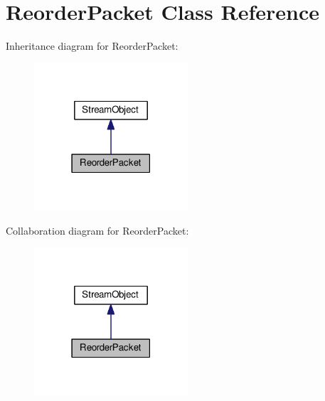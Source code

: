 \hypertarget{class_reorder_packet}{}\section{Reorder\+Packet Class Reference}
\label{class_reorder_packet}


Inheritance diagram for Reorder\+Packet\+:\nopagebreak
\begin{figure}[H]
\begin{center}
\leavevmode
\includegraphics[width=162pt]{class_reorder_packet__inherit__graph}
\end{center}
\end{figure}


Collaboration diagram for Reorder\+Packet\+:\nopagebreak
\begin{figure}[H]
\begin{center}
\leavevmode
\includegraphics[width=162pt]{class_reorder_packet__coll__graph}
\end{center}
\end{figure}
